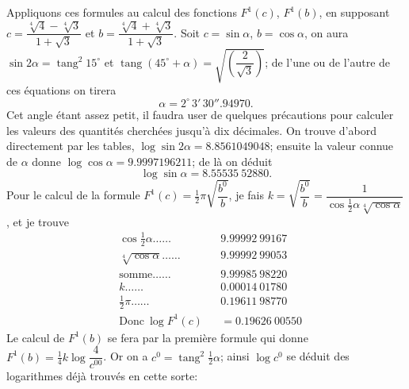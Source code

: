 \documentclass{article}
\begin{document}
Appliquons ces formules au calcul des fonctions $F^{1}(c)$, $F^{1}(b)$, en supposant $c=\dfrac{\sqrt[4]{4}-\sqrt[4]{3}}{1+\sqrt{3}}$ et $b=\dfrac{\sqrt[4]{4}+\sqrt[4]{3}}{1+\sqrt{3}}$. Soit $c=\sin\alpha$, $b=\cos\alpha$, on aura $\sin 2\alpha=\operatorname{tang}^{2}15^{\circ}$ et $\operatorname{tang}(45^{\circ}+\alpha)=\sqrt{\left(\dfrac{2}{\sqrt{3}}\right)}$; de l'une ou de l'autre de ces équations on tirera
\[ \alpha=2^{\circ}\,3'\,30''.94970. \]
Cet angle étant assez petit, il faudra user de quelques précautions pour calculer les valeurs des quantités cherchées jusqu'à dix décimales. On trouve d'abord directement par les tables, $\log\sin 2\alpha=8.8561049048$; ensuite la valeur connue de $\alpha$ donne $\log\cos\alpha=9.9997196211$; de là on déduit
\[ \log\sin\alpha=8.55535\ 52880. \]
Pour le calcul de la formule $F^{1}(c)=\frac{1}{2}\pi\sqrt{\dfrac{b^{0}}{b}}$, je fais $k=\sqrt{\dfrac{b^{0}}{b}}=\dfrac{1}{\cos\frac{1}{2}\alpha\sqrt[4]{\cos\alpha}}$, et je trouve
\[ \begin{aligned} &\cos\tfrac{1}{2}\alpha\ldots\ldots && 9.99992\ 99167\\ &\sqrt[4]{\cos\alpha}\ldots\ldots && 9.99992\ 99053\\ &\text{somme}\ldots\ldots && 9.99985\ 98220\\ &k\ldots\ldots && 0.00014\ 01780\\ &\tfrac{1}{2}\pi\ldots\ldots && 0.19611\ 98770\\ &\text{Donc}\ \log F^{1}(c) && =0.19626\ 00550 \end{aligned} \]
Le calcul de $F^{1}(b)$ se fera par la première formule qui donne $F^{1}(b)=\frac{1}{4}k\log\dfrac{4}{c^{00}}$. Or on a $c^{0}=\operatorname{tang}^{2}\frac{1}{2}\alpha$; ainsi $\log c^{0}$ se déduit des logarithmes déjà trouvés en cette sorte:
\end{document}
